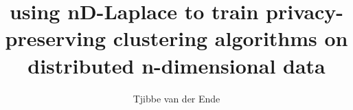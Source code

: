 \documentclass{ou-report}
\begin{document}
\pagestyle{plain}
\title{using nD-Laplace to train privacy-preserving clustering algorithms on distributed n-dimensional data}
\author{Tjibbe van der Ende}
%



\frontmatter
\renewcommand{\algorithmicrequire}{\textbf{Input:}}
\renewcommand{\algorithmicensure}{\textbf{Output:}}
\let\cleardoublepage\clearpage

%

%
\tableofcontents



%
%



\mainmatter
{}







\newpage

\newpage

\newpage


%

%

%

%

%



\backmatter
{}





%  
%  
%  
\clearpage
\printglossaries

\appendix


\end{document}
